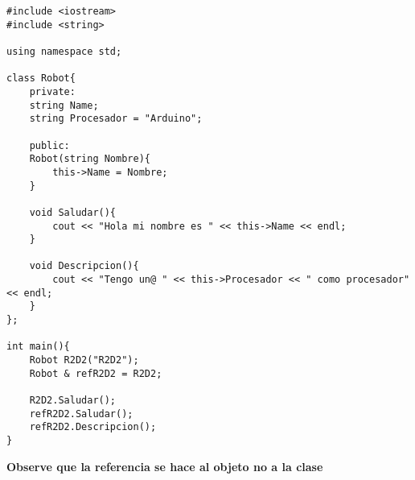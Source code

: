 \documentclass[12pt]{extarticle}
\newcommand{\<}{\langle}
\renewcommand{\>}{\rangle}
\theoremstyle{definition}
\begin{document}
\begin{lstlisting}
#include <iostream>
#include <string>

using namespace std; 

class Robot{
	private:
	string Name;
	string Procesador = "Arduino";
	
	public:
	Robot(string Nombre){
		this->Name = Nombre;
	}
	
	void Saludar(){
		cout << "Hola mi nombre es " << this->Name << endl; 
	}
	
	void Descripcion(){
		cout << "Tengo un@ " << this->Procesador << " como procesador" << endl; 
	}
};

int main(){
	Robot R2D2("R2D2");
	Robot & refR2D2 = R2D2;
	
	R2D2.Saludar();
	refR2D2.Saludar();
	refR2D2.Descripcion();
}
\end{lstlisting}

\textbf{Observe que la referencia se hace al objeto no a la clase} 
\end{document}
